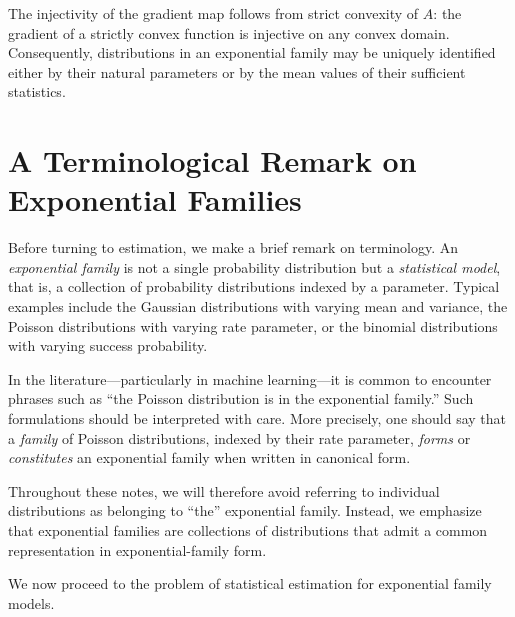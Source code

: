 \begin{remark}
The injectivity of the gradient map follows from strict convexity of \(A\): the
gradient of a strictly convex function is injective on any convex domain.
Consequently, distributions in an exponential family may be uniquely identified
either by their natural parameters or by the mean values of their sufficient
statistics.
\end{remark}

\section{A Terminological Remark on Exponential Families}

Before turning to estimation, we make a brief remark on terminology. An
\emph{exponential family} is not a single probability distribution but a
\emph{statistical model}, that is, a collection of probability distributions
indexed by a parameter. Typical examples include the Gaussian distributions with
varying mean and variance, the Poisson distributions with varying rate parameter,
or the binomial distributions with varying success probability.

In the literature—particularly in machine learning—it is common to encounter
phrases such as “the Poisson distribution is in the exponential family.” Such
formulations should be interpreted with care. More precisely, one should say
that a \emph{family} of Poisson distributions, indexed by their rate parameter,
\emph{forms} or \emph{constitutes} an exponential family when written in
canonical form.

Throughout these notes, we will therefore avoid referring to individual
distributions as belonging to “the” exponential family. Instead, we emphasize
that exponential families are collections of distributions that admit a common
representation in exponential-family form.

We now proceed to the problem of statistical estimation for exponential family
models.
